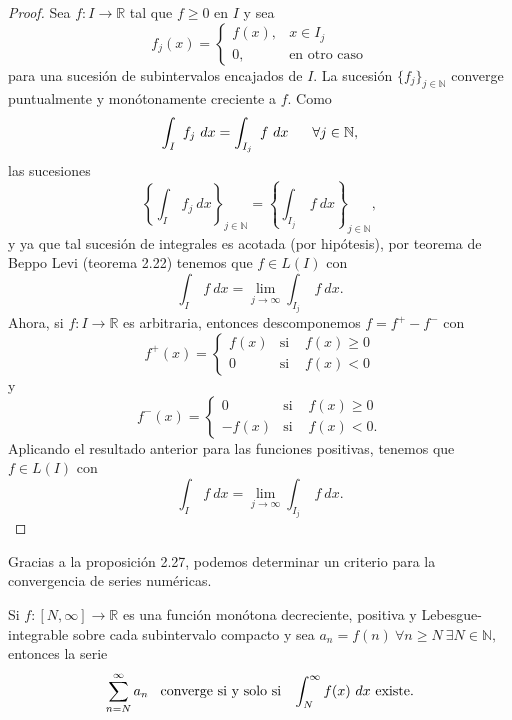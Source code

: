 \begin{proof}
	Sea $f: I \rightarrow \mathbb{R}$ tal que $f \geq 0$ en $I$ y sea
	\[
	f_j(x) = \left\{ \begin{array}{lcl}
	f(x),  & x \in I_j\\
	0,  & \mbox{en otro caso}
	\end{array}
	\right.
	\] para una sucesión de subintervalos encajados de $I.$ La sucesión $\{f_j\}_{j \in \mathbb{N}}$ converge puntualmente y monótonamente creciente a $f.$ Como $$\int_{I}\ f_j\ dx = \int_{I_j}\ f\ dx\hspace{0.6cm}\forall j \in \mathbb{N},$$ las sucesiones $$\left\{\int_{I}\ f_j\ dx\right\}_{j \in \mathbb{N}} = \left\{\int_{I_j}\ f\ dx\right\}_{j \in \mathbb{N}},$$ y ya que tal sucesión de integrales es acotada (por hipótesis), por teorema de Beppo Levi (teorema 2.22) tenemos que $f \in L(I)$ con $$\int_{I}\ f\ dx = \lim_{j \rightarrow \infty}\int_{I_j}\ f\ dx.$$
	Ahora, si $f: I \rightarrow \mathbb{R}$ es arbitraria, entonces descomponemos $f = f^+ - f^-$ con \[
	f^+(x) = \left\{ \begin{array}{lcl}
	f(x)  & \mbox{si } & f(x) \geq 0\\
	0  & \mbox{si} & f(x) < 0
	\end{array}
	\right.
	\] y \[
	f^-(x) = \left\{ \begin{array}{lcl}
	0  & \mbox{si } & f(x) \geq 0\\
	-f(x)  & \mbox{si} & f(x) < 0.
	\end{array}
	\right.
	\]
	Aplicando el resultado anterior para las funciones positivas, tenemos que $f \in L(I)$ con $$\int_{I}\ f\ dx = \lim_{j \rightarrow \infty}\int_{I_j}\ f\ dx.$$
\end{proof}
Gracias a la proposición 2.27, podemos determinar un criterio para la convergencia de series numéricas.
\begin{proposition}
	Si $f:[N,\infty] \rightarrow \mathbb{R}$ es una función monótona decreciente, positiva y Lebesgue-integrable sobre cada subintervalo compacto y sea $a_n = f(n)\ \forall n \geq N\ \exists N \in \mathbb{N},$ entonces la serie $$\sum_{n = N}^{\infty}a_n\hspace{0.3cm}\textrm{converge si y solo si}\hspace{0.3cm}\int_{N}^{\infty}f(x)\ dx\ \textrm{existe.}$$
\end{proposition}
